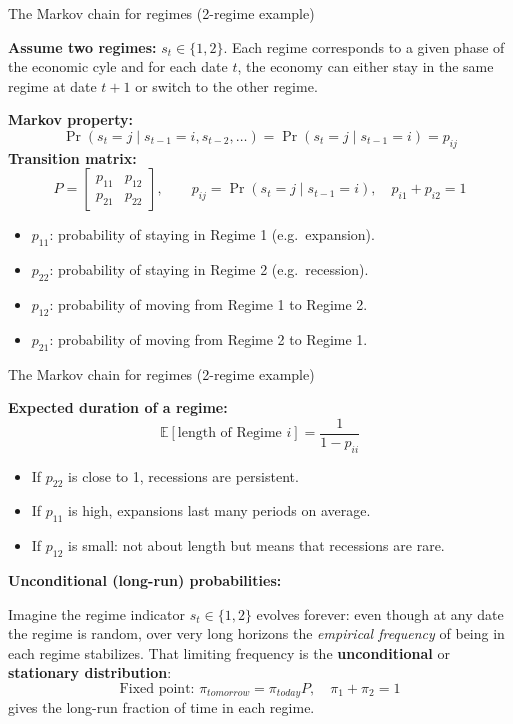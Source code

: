 \documentclass{beamer}
\begin{document}
\begin{frame}{The Markov chain for regimes (2-regime example)}
\small

\textbf{Assume two regimes:} $s_t \in \{1,2\}$. Each regime corresponds to a given phase of the economic cyle and for each date $t$, the economy can either stay in the same regime at date $t+1$ or switch to the other regime. 

\medskip
\textbf{Markov property:}
\[
\Pr(s_t = j \mid s_{t-1}=i, s_{t-2},\dots) =
\Pr(s_t = j \mid s_{t-1}=i) = p_{ij}
\]
\textbf{Transition matrix:}
\[
P =
\begin{bmatrix}
p_{11} & p_{12} \\
p_{21} & p_{22}
\end{bmatrix},
\qquad
p_{ij} = \Pr(s_t = j \mid s_{t-1} = i),
\quad
p_{i1} + p_{i2} = 1
\]
\pause
\begin{itemize}
  \item $p_{11}$: probability of staying in Regime 1 (e.g.\ expansion).
  \item $p_{22}$: probability of staying in Regime 2 (e.g.\ recession).
  \item $p_{12}$: probability of moving from Regime 1 to Regime 2.
  \item $p_{21}$: probability of moving from Regime 2 to Regime 1.
\end{itemize}


\end{frame}



\begin{frame}{The Markov chain for regimes (2-regime example)}
\small

\textbf{Expected duration of a regime:}
\[
\mathbb{E}[\text{length of Regime } i] = \frac{1}{1 - p_{ii}}
\]

\begin{itemize}
  \item If $p_{22}$ is close to 1, recessions are persistent.
  \item If $p_{11}$ is high, expansions last many periods on average.
  \item If $p_{12}$ is small: not about length but means that recessions are rare.
\end{itemize}

\pause
\textbf{Unconditional (long-run) probabilities:}

Imagine the regime indicator $s_t \in \{1,2\}$ evolves forever: even though at any date the regime is random, over very long horizons the \emph{empirical frequency} of being in each regime stabilizes. That limiting frequency is the \textbf{unconditional} or \textbf{stationary distribution}:
\[
\text{Fixed point: }\pi_{tomorrow} = \pi_{today} P, \quad \pi_1 + \pi_2 = 1
\]
gives the long-run fraction of time in each regime.

\end{frame}
\end{document}
